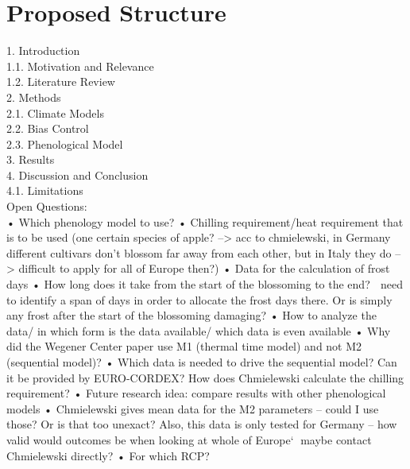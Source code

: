 \section{Proposed Structure} 
1. Introduction \\
1.1. Motivation and Relevance \\
1.2. Literature Review \\
2. Methods \\
2.1. Climate Models \\
2.2. Bias Control \\
2.3. Phenological Model \\
3. Results \\
4. Discussion and Conclusion \\
4.1. Limitations \\

\todo Open Questions:  \\
    • Which phenology model to use?
    • Chilling requirement/heat requirement that is to be used (one certain species of apple? –> acc to chmielewski, in Germany different cultivars don’t blossom far away from each other, but in Italy they do –> difficult to apply for all of Europe then?)
    • Data for the calculation of frost days
    • How long does it take from the start of the blossoming to the end?  need to identify a span of days in order to allocate the frost days there. Or is simply any frost after the start of the blossoming damaging?
    • How to analyze the data/ in which form is the data available/ which data is even available
    • Why did the Wegener Center paper use M1 (thermal time model) and not M2 (sequential model)?
    • Which data is needed to drive the sequential model? Can it be provided by EURO-CORDEX? How does Chmielewski calculate the chilling requirement? 
    • Future research idea: compare results with other phenological models
    • Chmielewski gives mean data for the M2 parameters – could I use those? Or is that too unexact? Also, this data is only tested for Germany – how valid would outcomes be when looking at whole of Europe` maybe contact Chmielewski directly?
    • For which RCP? \\






